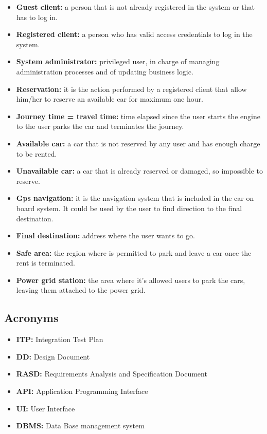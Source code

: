 \begin{itemize}
\item \textbf{Guest client:} a person that is not already registered in the system or that has to log in.
\item \textbf{Registered client:} a person who has valid access credentials to log in the system.
\item \textbf{System administrator:} privileged user, in charge of managing administration processes and of updating business logic.
\item \textbf{Reservation:} it is the action performed by a registered client that allow him/her to reserve an available car for maximum one hour.
\item \textbf{Journey time = travel time:} time elapsed since the user starts the engine to the user parks the car and terminates the journey.
\item \textbf{Available car:} a car that is not reserved by any user and has enough charge to be rented.
\item \textbf{Unavailable car:} a car that is already reserved or damaged, so impossible to reserve.
\item \textbf{Gps navigation:} it is the navigation system that is included in the car on board system. It could be used by the user to find direction to the final destination.
\item \textbf{Final destination:} address where the user wants to go.
\item \textbf{Safe area:} the region where is permitted to park and leave a car once the rent is terminated.
\item \textbf{Power grid station:} the area where it’s allowed users to park the cars, leaving them attached to the power grid.
\end{itemize}

\subsection{Acronyms}

\begin{itemize}
\item \textbf{ITP: } Integration Test Plan
\item \textbf{DD: } Design Document
\item \textbf{RASD:} Requirements Analysis and Specification Document
\item \textbf{API:} Application Programming Interface
\item \textbf{UI:} User Interface
\item \textbf{DBMS: } Data Base management system
\end{itemize}

